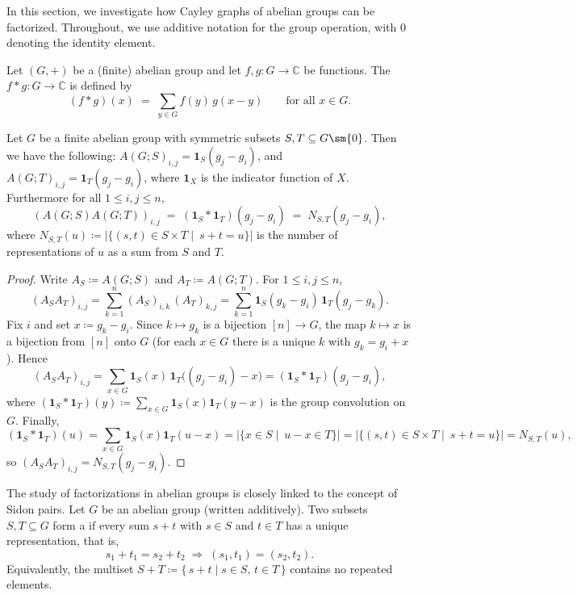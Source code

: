 \documentclass{file}
\begin{document}
In this section, we investigate how Cayley graphs of abelian groups can be factorized.
Throughout, we use additive notation for the group operation, with $0$ denoting the identity element.



\begin{defn}
Let $(G,+)$ be a (finite) abelian group and let $f,g \colon G \to \mathbb{C}$ be functions.
The  $f * g : G \to \mathbb{C}$ is defined by
\[
(f * g)(x) \;=\; \sum_{y \in G} f(y)\,g(x-y)
\qquad\text{for all } x\in G.
\]
\end{defn}


\begin{thm}\label{thm:circulant-conv-1}
Let $G$ be a finite abelian group with symmetric subsets $S,T\subseteq G\sm  \{0\}$.
Then we have the following:
$A(G;S)_{i,j}=\mathbf 1_S(g_j-g_i)$, and
$A(G;T)_{i,j}=\mathbf 1_T(g_j-g_i)$,
where $\mathbf 1_X$ is the indicator function of $X$.
Furthermore for all $1\le i,j\le n$,
\begin{equation}\label{eq:conv-entry}
(A(G;S)A(G;T))_{i,j}
\;=\;(\mathbf 1_S * \mathbf 1_T)(g_j-g_i)
\;=\;N_{S,T}(g_j-g_i),
\end{equation}
where $N_{S,T}(u)\coloneqq \bigl|\{(s,t)\in S\times T\mid \ s+t=u\}\bigr|$ is the number of
representations of $u$ as a sum from $S$ and $T$.
\end{thm}


\begin{proof}
Write $A_S\coloneqq A(G;S)$ and $A_T\coloneqq A(G;T)$. For $1\le i,j\le n$,
\[
(A_SA_T)_{i,j}
=\sum_{k=1}^n (A_S)_{i,k}\,(A_T)_{k,j}
=\sum_{k=1}^n \mathbf 1_S(g_k-g_i)\,\mathbf 1_T(g_j-g_k).
\]
Fix $i$ and set $x\coloneqq g_k-g_i$. Since $k\mapsto g_k$ is a bijection $[n]\!\to\! G$, the map $k\mapsto x$ is a bijection from $[n]$ onto $G$ (for each $x\in G$ there is a unique $k$ with $g_k=g_i+x$). Hence
\[
(A_SA_T)_{i,j}
=\sum_{x\in G} \mathbf 1_S(x)\,\mathbf 1_T\bigl((g_j-g_i)-x\bigr)
=(\mathbf 1_S * \mathbf 1_T)(g_j-g_i),
\]
where $(\mathbf 1_S * \mathbf 1_T)(y)\coloneqq \sum_{x\in G}\mathbf 1_S(x)\mathbf 1_T(y-x)$ is the group convolution on $G$.
Finally,
\[
(\mathbf 1_S * \mathbf 1_T)(u)
=\sum_{x\in G}\mathbf 1_S(x)\mathbf 1_T(u-x)
=\bigl|\{x\in S\mid \ u-x\in T\}\bigr|
=\bigl|\{(s,t)\in S\times T\mid \ s+t=u\}\bigr|
=N_{S,T}(u),
\]
so $(A_SA_T)_{i,j}=N_{S,T}(g_j-g_i)$.
\end{proof}


The study of factorizations in abelian groups is closely linked to the concept of Sidon pairs.
Let $ G $ be an abelian group (written additively).  
Two subsets $ S, T \subseteq G $ form a  if every sum $ s + t $ with $ s \in S $ and $ t \in T $ has a unique representation, that is,
\[
s_1 + t_1 = s_2 + t_2 \;\Longrightarrow\; (s_1, t_1) = (s_2, t_2).
\]
Equivalently, the multiset
$S + T \coloneqq \{\, s + t \mid s \in S,\, t \in T \,\}$
contains no repeated elements.
\end{document}
